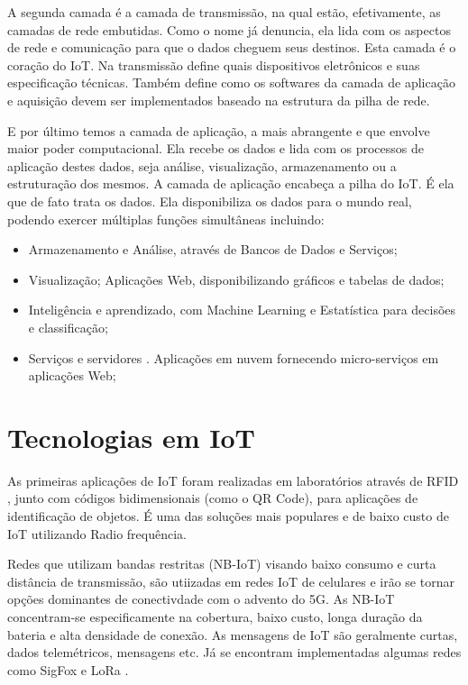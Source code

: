 A segunda camada é a camada de transmissão, na qual estão, efetivamente, as camadas de rede embutidas. Como o nome já denuncia, ela lida com os aspectos de rede e comunicação para que o dados cheguem seus destinos. Esta camada é o coração do IoT. Na transmissão define quais dispositivos eletrônicos e suas especificação técnicas. Também define como os softwares da camada de aplicação e aquisição devem ser implementados baseado na estrutura da pilha de rede.

 E por último temos a camada de aplicação, a mais abrangente e que envolve maior poder computacional. Ela recebe os dados e lida com os processos de aplicação destes dados, seja análise, visualização, armazenamento ou a estruturação dos mesmos. A camada de aplicação encabeça a pilha do IoT. É ela que de fato trata os dados. Ela disponibiliza os dados para o mundo real, podendo exercer múltiplas funções simultâneas incluindo:

\begin{itemize}
\item Armazenamento e Análise, através de Bancos de Dados e Serviços;
\item Visualização; Aplicações Web, disponibilizando gráficos e tabelas de dados;
\item Inteligência e aprendizado, com Machine Learning e Estatística para decisões e classificação;
\item Serviços e servidores . Aplicações em nuvem fornecendo micro-serviços em aplicações Web;
\end{itemize}


\section{Tecnologias em IoT}
\label{section:tecnologias_iot}

As primeiras aplicações de IoT foram realizadas em laboratórios através de RFID \cite{Rampim:iot}, junto com códigos bidimensionais (como o QR Code), para aplicações de identificação de objetos.  É uma das soluções mais populares e de baixo custo de IoT utilizando Radio frequência.

Redes que utilizam bandas restritas (NB-IoT) visando baixo consumo e curta distância de transmissão, são utiizadas em redes IoT de celulares e irão se tornar opções dominantes de conectivdade com o advento do 5G. As NB-IoT concentram-se especificamente na cobertura, baixo custo, longa duração da bateria e alta densidade de conexão. As mensagens de IoT são geralmente curtas, dados telemétricos, mensagens etc. Já se encontram implementadas algumas redes como SigFox \cite{Sigfox} e LoRa \cite{LoRa}. 

